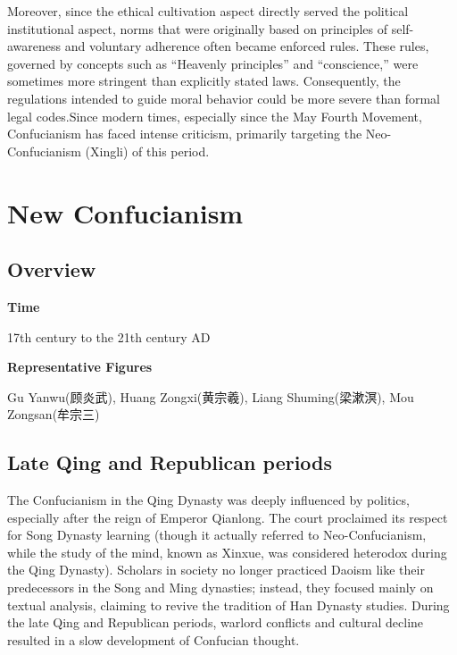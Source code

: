 \documentclass[
]{book}
\begin{document}
Moreover, since the ethical cultivation aspect directly served the political institutional aspect, norms that were originally based on principles of self-awareness and voluntary adherence often became enforced rules. These rules, governed by concepts such as ``Heavenly principles'' and ``conscience,'' were sometimes more stringent than explicitly stated laws. Consequently, the regulations intended to guide moral behavior could be more severe than formal legal codes.Since modern times, especially since the May Fourth Movement, Confucianism has faced intense criticism, primarily targeting the Neo-Confucianism (Xingli) of this period.

\hypertarget{new-confucianism}{%
\chapter{New Confucianism}\label{new-confucianism}}

\hypertarget{overview-3}{%
\section{Overview}\label{overview-3}}

\textbf{Time}

17th century to the 21th century AD

\textbf{Representative Figures}

Gu Yanwu(顾炎武), Huang Zongxi(黄宗羲), Liang Shuming(梁漱溟), Mou Zongsan(牟宗三)

\hypertarget{late-qing-and-republican-periods}{%
\section{Late Qing and Republican periods}\label{late-qing-and-republican-periods}}

The Confucianism in the Qing Dynasty was deeply influenced by politics, especially after the reign of Emperor Qianlong. The court proclaimed its respect for Song Dynasty learning (though it actually referred to Neo-Confucianism, while the study of the mind, known as Xinxue, was considered heterodox during the Qing Dynasty). Scholars in society no longer practiced Daoism like their predecessors in the Song and Ming dynasties; instead, they focused mainly on textual analysis, claiming to revive the tradition of Han Dynasty studies. During the late Qing and Republican periods, warlord conflicts and cultural decline resulted in a slow development of Confucian thought.
\end{document}
